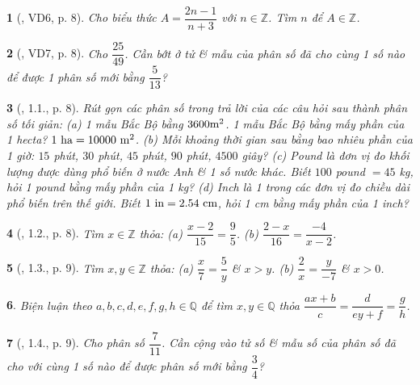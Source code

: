 \documentclass{article}
\newtheorem{baitoan}{}
\begin{document}
\begin{baitoan}[\cite{Binh_boi_duong_Toan_6_tap_2}, VD6, p. 8]
	Cho biểu thức $A = \dfrac{2n - 1}{n + 3}$ với $n\in\mathbb{Z}$. Tìm $n$ để $A\in\mathbb{Z}$.
\end{baitoan}

\begin{baitoan}[\cite{Binh_boi_duong_Toan_6_tap_2}, VD7, p. 8]
	Cho $\dfrac{25}{49}$. Cần bớt ở tử \& mẫu của phân số đã cho cùng 1 số nào để được 1 phân số mới bằng $\dfrac{5}{13}$?
\end{baitoan}

\begin{baitoan}[\cite{Binh_boi_duong_Toan_6_tap_2}, 1.1., p. 8]
	Rút gọn các phân số trong trả lời của các câu hỏi sau thành phân số tối giản: (a) 1 mẫu Bắc Bộ bằng $\rm3600 m^2$. 1 mẫu Bắc Bộ bằng mấy phần của 1 hecta? $\rm1\ ha = 10000\ m^2$. (b) Mỗi khoảng thời gian sau bằng bao nhiêu phần của 1 giờ: $15$ phút, $30$ phút, $45$ phút, $90$ phút, $4500$ giây? (c) Pound là đơn vị đo khối lượng được dùng phổ biến ở nước Anh \& 1 số nước khác. Biết $100$ pound $= 45$ {\rm kg}, hỏi 1 pound bằng mấy phần của {\rm1 kg}? (d) Inch là 1 trong các đơn vị đo chiều dài phổ biến trên thế giới. Biết $\rm1\ in = 2.54\ cm$, hỏi {\rm1 cm} bằng mấy phần của {\rm1 inch}?
\end{baitoan}

\begin{baitoan}[\cite{Binh_boi_duong_Toan_6_tap_2}, 1.2., p. 8]
	Tìm $x\in\mathbb{Z}$ thỏa: (a) $\dfrac{x - 2}{15} = \dfrac{9}{5}$. (b) $\dfrac{2 - x}{16} = \dfrac{-4}{x - 2}$.
\end{baitoan}

\begin{baitoan}[\cite{Binh_boi_duong_Toan_6_tap_2}, 1.3., p. 9]
	Tìm $x,y\in\mathbb{Z}$ thỏa: (a) $ \dfrac{x}{7} = \dfrac{5}{y}$ \& $x > y$. (b) $\dfrac{2}{x} = \dfrac{y}{-7}$ \& $x > 0$.
\end{baitoan}

\begin{baitoan}
	Biện luận theo $a,b,c,d,e,f,g,h\in\mathbb{Q}$ để tìm $x,y\in\mathbb{Q}$ thỏa $\dfrac{ax + b}{c} = \dfrac{d}{ey + f} = \dfrac{g}{h}$.
\end{baitoan}

\begin{baitoan}[\cite{Binh_boi_duong_Toan_6_tap_2}, 1.4., p. 9]
	Cho phân số $\dfrac{7}{11}$. Cần cộng vào tử số \& mẫu số của phân số đã cho với cùng 1 số nào để được phân số mới bằng $\dfrac{3}{4}$?
\end{baitoan}
\end{document}
